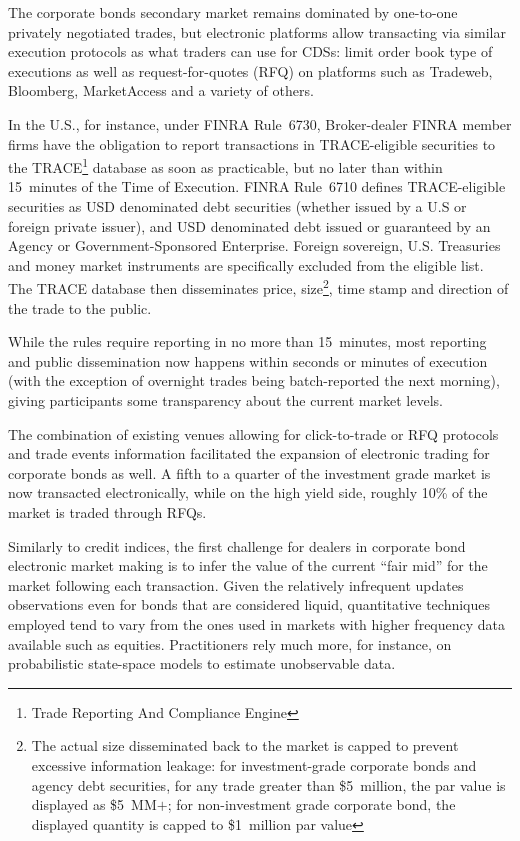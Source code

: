 The corporate bonds secondary market remains dominated by one-to-one privately negotiated trades, but electronic platforms allow transacting via similar execution protocols as what traders can use for CDSs: limit order book type of executions as well as request-for-quotes (RFQ) on platforms such as Tradeweb, Bloomberg, MarketAccess and a variety of others.


In the U.S., for instance, under FINRA Rule~6730, Broker-dealer FINRA member firms have the obligation to report transactions in TRACE-eligible securities to the TRACE\footnote{Trade Reporting And Compliance Engine} database as soon as practicable, but no later than within 15~minutes of the Time of Execution. FINRA Rule~6710 defines TRACE-eligible securities as USD denominated debt securities (whether issued by a U.S or foreign private issuer), and USD denominated debt issued or guaranteed by an Agency or Government-Sponsored Enterprise. Foreign sovereign, U.S. Treasuries and money market instruments are specifically excluded from the eligible list. The TRACE database then disseminates price, size\footnote{The actual size disseminated back to the market is capped to prevent excessive information leakage: for investment-grade corporate bonds and agency debt securities, for any trade greater than \$5~million, the par value is displayed as \$5~MM$+$; for non-investment grade corporate bond, the displayed quantity is capped to \$1~million par value}, time stamp and direction of the trade to the public.


While the rules require reporting in no more than 15~minutes, most reporting and public dissemination now happens within seconds or minutes of execution (with the exception of overnight trades being batch-reported the next morning), giving participants some transparency about the current market levels.


The combination of existing venues allowing for click-to-trade or RFQ protocols and trade events information facilitated the expansion of electronic trading for corporate bonds as well. A fifth to a quarter of the investment grade market is now transacted electronically, while on the high yield side, roughly 10\% of the market is traded through RFQs.


Similarly to credit indices, the first challenge for dealers in corporate bond electronic market making is to infer the value of the current ``fair mid'' for the market following each transaction. Given the relatively infrequent updates observations even for bonds that are considered liquid, quantitative techniques employed tend to vary from the ones used in markets with higher frequency data available such as equities. Practitioners rely much more, for instance, on probabilistic state-space models to estimate unobservable data.


